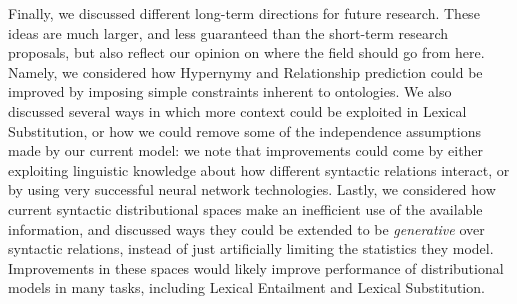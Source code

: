 \documentclass[12pt]{article}
\begin{document}
Finally, we discussed different long-term directions for future research. These
ideas are much larger, and less guaranteed than the short-term research
proposals, but also reflect our opinion on where the field should go from here.
Namely, we considered how Hypernymy and Relationship prediction could be
improved by imposing simple constraints inherent to ontologies. We also
discussed several ways in which more context could be exploited in Lexical
Substitution, or how we could remove some of the independence assumptions made
by our current model: we note that improvements could come by either
exploiting linguistic knowledge about how different syntactic relations
interact, or by using very successful neural network technologies. Lastly, we
considered how current syntactic distributional spaces make an inefficient use
of the available information, and discussed ways they could be extended to be
{\em generative} over syntactic relations, instead of just artificially
limiting the statistics they model. Improvements in these spaces would likely
improve performance of distributional models in many tasks, including
Lexical Entailment and Lexical Substitution.

\pagebreak


\end{document}
